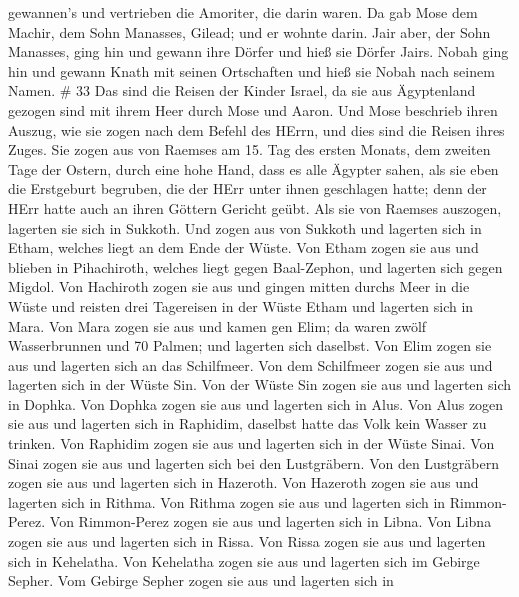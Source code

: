 gewannen's und vertrieben die Amoriter, die darin waren. 
Da gab Mose dem Machir, dem Sohn Manasses, Gilead; und er wohnte darin.
 Jair aber, der Sohn Manasses, ging hin und gewann ihre
Dörfer und hieß sie Dörfer Jairs.  Nobah ging hin und
gewann Knath mit seinen Ortschaften und hieß sie Nobah nach seinem
Namen. \# 33  Das sind die Reisen der Kinder Israel, da sie
aus Ägyptenland gezogen sind mit ihrem Heer durch Mose und Aaron.
 Und Mose beschrieb ihren Auszug, wie sie zogen nach dem
Befehl des HErrn, und dies sind die Reisen ihres Zuges.  Sie
zogen aus von Raemses am 15. Tag des ersten Monats, dem zweiten Tage der
Ostern, durch eine hohe Hand, dass es alle Ägypter sahen, 
als sie eben die Erstgeburt begruben, die der HErr unter ihnen
geschlagen hatte; denn der HErr hatte auch an ihren Göttern Gericht
geübt.  Als sie von Raemses auszogen, lagerten sie sich in
Sukkoth.  Und zogen aus von Sukkoth und lagerten sich in
Etham, welches liegt an dem Ende der Wüste.  Von Etham zogen
sie aus und blieben in Pihachiroth, welches liegt gegen Baal-Zephon, und
lagerten sich gegen Migdol.  Von Hachiroth zogen sie aus und
gingen mitten durchs Meer in die Wüste und reisten drei Tagereisen in
der Wüste Etham und lagerten sich in Mara.  Von Mara zogen
sie aus und kamen gen Elim; da waren zwölf Wasserbrunnen und 70 Palmen;
und lagerten sich daselbst.  Von Elim zogen sie aus und
lagerten sich an das Schilfmeer.  Von dem Schilfmeer zogen
sie aus und lagerten sich in der Wüste Sin.  Von der Wüste
Sin zogen sie aus und lagerten sich in Dophka.  Von Dophka
zogen sie aus und lagerten sich in Alus.  Von Alus zogen
sie aus und lagerten sich in Raphidim, daselbst hatte das Volk kein
Wasser zu trinken.  Von Raphidim zogen sie aus und lagerten
sich in der Wüste Sinai.  Von Sinai zogen sie aus und
lagerten sich bei den Lustgräbern.  Von den Lustgräbern
zogen sie aus und lagerten sich in Hazeroth.  Von Hazeroth
zogen sie aus und lagerten sich in Rithma.  Von Rithma
zogen sie aus und lagerten sich in Rimmon-Perez.  Von
Rimmon-Perez zogen sie aus und lagerten sich in Libna.  Von
Libna zogen sie aus und lagerten sich in Rissa.  Von Rissa
zogen sie aus und lagerten sich in Kehelatha.  Von
Kehelatha zogen sie aus und lagerten sich im Gebirge Sepher.
 Vom Gebirge Sepher zogen sie aus und lagerten sich in
